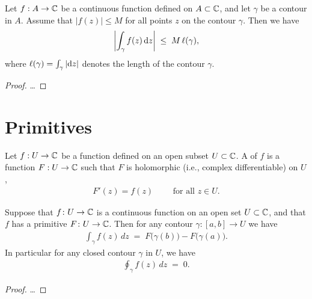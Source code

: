 \begin{corollary}
  \label{lem:contour_integral_bound}
  Let $f : A \to \mathbb{C}$ be a continuous function defined on $A \subset \mathbb{C}$,
  and let $\gamma$ be a contour in $A$.
  Assume that $|f(z)| \le M$ for all points $z$ on the contour $\gamma$.
  Then we have
  \begin{align*}
    \left| \int_\gamma f(z) \, \mathrm{d} z \right| \; \le \; M \, \ell(\gamma) ,
  \end{align*}
  where $\ell(\gamma) = \int_\gamma |\mathrm{d} z|$ denotes the length of
  the contour $\gamma$.
\end{corollary}
\begin{proof}
  \ldots
\end{proof}



\section{Primitives}

\begin{definition}
  \label{def:primitive}
  Let $f : U \to \mathbb{C}$ be a function defined on an open subset $U \subset \mathbb{C}$.
  A  of $f$ is a function $F : U \to \mathbb{C}$ such that
  $F$ is holomorphic (i.e., complex differentiable) on $U$,
  \begin{align*}
    F'(z) = f(z) \qquad \text{ for all } z \in U .
  \end{align*}
\end{definition}

\begin{theorem}
  \label{thm:ftc_for_contour_integrals}
  Suppose that $f \colon U \to \mathbb{C}$ is a continuous function
  on an open set $U \subset \mathbb{C}$, and that $f$ has a
  primitive $F \colon U \to \mathbb{C}$.
  Then for any contour $\gamma \colon [a,b] \to U$ we have
  \begin{align*}
    \int_\gamma f(z) \, dz \; = \; F \big( \gamma(b) \big) - F \big( \gamma(a) \big) .
  \end{align*}
  In particular for any closed contour $\gamma$ in $U$, we have
  \begin{align*}
    \oint_\gamma f(z) \, dz \; = \; 0 .
  \end{align*}
\end{theorem}
\begin{proof}
  \ldots
\end{proof}


